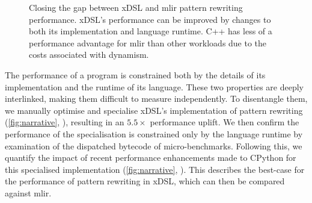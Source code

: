 \begin{figure}
    \centering
    \caption{Closing the gap between xDSL and \ac{mlir} pattern rewriting performance. xDSL's performance can be improved by changes to both its implementation and language runtime. C++ has less of a performance advantage for \ac{mlir} than other workloads due to the costs associated with dynamism.}
    \label{fig:narrative}
\end{figure}

The performance of a program is constrained both by the details of its implementation and the runtime of its language.
These two properties are deeply interlinked, making them difficult to measure independently.
To disentangle them, we manually optimise and specialise xDSL's implementation of pattern rewriting (\autoref{fig:narrative}, ), resulting in an $5.5\times$ performance uplift. %
We then confirm the performance of the specialisation is constrained only by the language runtime by examination of the dispatched bytecode of micro-benchmarks.
Following this, we quantify the impact of recent performance enhancements made to CPython for this specialised implementation (\autoref{fig:narrative}, ). %
This describes the best-case for the performance of pattern rewriting in xDSL, which can then be compared against \ac{mlir}.


